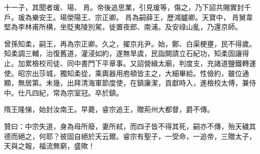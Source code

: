 \begin{pinyinscope}
 十一子，其聞者瑗、瑒、肙。帝後追思業，引見瑗等，傷之，乃下詔共賜實封千戶。瑗為樂安王。瑒滎陽王、宗正卿。肙為嗣薛王，歷鴻臚卿。天寶中，肙舅韋堅為李林甫所構，坐貶夷陵別駕，徙置夜郎、南浦。及安祿山亂，乃還京師。



 曾孫知柔，嗣王，再為宗正卿。久之，擢京兆尹。始，鄭、白渠梗壅，民不得歲。知柔調三輔，治復舊道，灌浸如約，遂無旱虞，民詣闕請立石紀功，知柔固讓得止。加累檢校司徒、同中書門下平章事。又詔營緝太廟，判度支，充諸道鹽鐵轉運使。昭宗出莎城，獨知柔從，乘輿器用庖頓皆主之，大細畢給。性儉約，雖位通顯，無居第。未幾，出拜清海軍節度使，在鎮廉潔，貢獻時入，進檢校太傅，兼侍中。仕凡四紀，常為宗室冠。卒於鎮。



 隋王隆悌，始封汝南王。早薨，睿宗追王，贈荊州大都督，爵不傳。



 贊曰：中宗失道，身為母所廢，妻所弒，而四子皆不得其死，嗣亦不傳，殆天穢其德而絕之，何耶？彼固自絕於天云爾。睿宗有聖子，一受命，一追帝，三贈太子，天與之報，福流無窮，盛歟！



\end{pinyinscope}